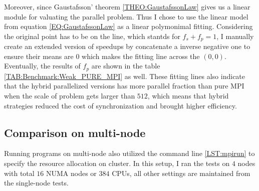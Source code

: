 Moreover, since Gaustafsson' theorem \ref{THEO:GaustafssonLaw} gives us a linear module for valuating the parallel problem.
Thus I chose to use the linear model from equation \ref{EQ:GaustafssonLaw} as a linear polymonimal fitting.
Considering the original point has to be on the line, which stantds for $f_s + f_p = 1$, 
I manually create an extended version of speedups by concatenate a inverse negative one to ensure their 
means are $0$ which makes the fitting line across the $(0,0)$. 
Eventually, the results of $f_p$ are shown in the table \ref{TAB:Benchmark:Weak_PURE_MPI} as well.
These fitting lines also indicate that the hybrid parallelized versions has more parallel fraction than pure MPI when the scale of problem gets larger than $512$,
which means that hybrid strategies reduced the cost of synchronization and brought higher efficiency.



\subsection{Comparison on multi-node}
Running programs on multi-node also utilized the command line \ref{LST:mpirun} to specify the resource allocation on cluster.
In this setup, I ran the tests on $4$ nodes with total $16$ NUMA nodes or $384$ CPUs, all other settings are maintained from the single-node tests.
